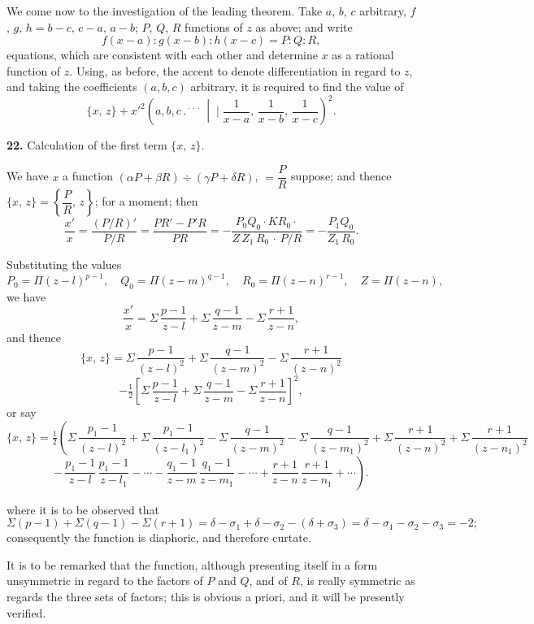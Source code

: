\documentclass[11pt]{article}
\newcommand{\artno}[1]{\textbf{#1.}\quad}
\begin{document}
We come now to the investigation of the leading theorem. Take $a$, $b$, $c$ arbitrary,
$f$, $g$, $h = b-c,\, c-a,\, a-b$; $P$, $Q$, $R$ functions of $z$ as above; and write
\[
   f(x-a) : g(x-b) : h(x-c) = P : Q : R,
\]
equations, which are consistent with each other and determine $x$ as a rational function
of $z$. Using, as before, the accent to denote differentiation in regard to $z$, and taking
the coefficients $(a, b, c)$ arbitrary, it is required to find the value of
\[
   \{x,\,z\} + x'^{2}\!\left(a, b, c \,.{}^{\!\cdot\!\cdot\!\cdot}\,\middle|\!\!\!\mid \frac{1}{x-a},\,\frac{1}{x-b},\,\frac{1}{x-c}\right)^{\!2}.
\]

\artno{22} Calculation of the first term $\{x,\,z\}$.

We have $x$ a function $(\alpha P + \beta R) \div (\gamma P + \delta R)$, $=\dfrac{P}{R}$ suppose; and thence $\{x,\,z\} = \left\{\dfrac{P}{R},\,z\right\}$;
for a moment; then
\[
   \frac{x'}{x} = \frac{(P/R)'}{P/R} = \frac{PR' - P'R}{PR} = -\frac{P_{0}Q_{0}\cdot KR_{0}\cdot}{Z\,Z_{1}\,R_{0}\,\cdot\,P/R} = -\frac{P_{1}Q_{0}}{Z_{1}\,R_{0}}.
\]

Substituting the values
\[
   P_{0} = \Pi(z-l)^{p-1},\quad Q_{0} = \Pi(z-m)^{q-1},\quad R_{0} = \Pi(z-n)^{r-1},\quad Z = \Pi(z-n),
\]
we have
\[
   \frac{x'}{x} = \Sigma\,\frac{p-1}{z-l} + \Sigma\,\frac{q-1}{z-m} - \Sigma\,\frac{r+1}{z-n},
\]
and thence
\[
   \{x,\,z\} = \Sigma\,\frac{p-1}{(z-l)^{2}} + \Sigma\,\frac{q-1}{(z-m)^{2}} - \Sigma\,\frac{r+1}{(z-n)^{2}}
\]
\[
   - \tfrac{1}{2}\!\left[\Sigma\,\frac{p-1}{z-l} + \Sigma\,\frac{q-1}{z-m} - \Sigma\,\frac{r+1}{z-n}\right]^{2},
\]
or say
\[
   \{x,\,z\} = \tfrac{1}{2}\!\left(\Sigma\,\frac{p_{1}-1}{(z-l)^{2}} + \Sigma\,\frac{p_{1}-1}{(z-l_{1})^{2}} - \Sigma\,\frac{q-1}{(z-m)^{2}} - \Sigma\,\frac{q-1}{(z-m_{1})^{2}} + \Sigma\,\frac{r+1}{(z-n)^{2}} + \Sigma\,\frac{r+1}{(z-n_{1})^{2}}\right.
\]
\[
   \left.-\,\frac{p_{1}-1}{z-l}\,\frac{p_{1}-1}{z-l_{1}} - \cdots - \frac{q_{1}-1}{z-m}\,\frac{q_{1}-1}{z-m_{1}} - \cdots + \frac{r+1}{z-n}\,\frac{r+1}{z-n_{1}} + \cdots\right).
\]

\newpage
where it is to be observed that
\[
   \Sigma(p-1) + \Sigma(q-1) - \Sigma(r+1) = \delta - \sigma_{1} + \delta - \sigma_{2} - (\delta + \sigma_{3}) = \delta - \sigma_{1} - \sigma_{2} - \sigma_{3} = -2;
\]
consequently the function is diaphoric, and therefore curtate.

It is to be remarked that the function, although presenting itself in a form
unsymmetric in regard to the factors of $P$ and $Q$, and of $R$, is really symmetric
as regards the three sets of factors; this is obvious a priori, and it will be presently
verified.
\end{document}
